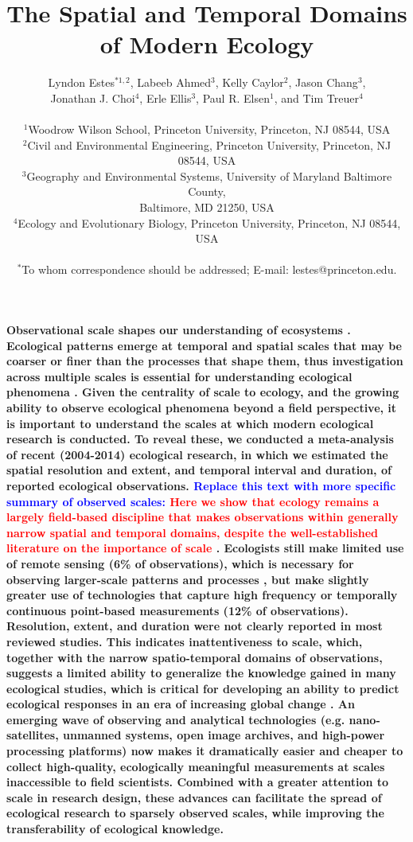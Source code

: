 \documentclass[12pt]{article}
\title{The Spatial and Temporal Domains of Modern Ecology }%
\author
{Lyndon Estes$^{\ast1, 2}$, Labeeb Ahmed$^{3}$, Kelly Caylor$^{2}$, Jason Chang$^{3}$, \\
Jonathan J. Choi$^{4}$, Erle Ellis$^{3}$, Paul R. Elsen$^{1}$, and Tim Treuer$^{4}$ \\
\\
\normalsize{$^{1}$Woodrow Wilson School, Princeton University, Princeton, NJ 08544, USA}\\
\normalsize{$^{2}$Civil and Environmental Engineering, Princeton University, Princeton, NJ 08544, USA}\\
\normalsize{$^{3}$Geography and Environmental Systems, University of Maryland Baltimore County,}\\
\normalsize{Baltimore, MD 21250, USA}\\
\normalsize{$^{4}$Ecology and Evolutionary Biology, Princeton University, Princeton, NJ 08544, USA}\\
\\
\normalsize{$^\ast$To whom correspondence should be addressed; E-mail:  lestes@princeton.edu.}
}
\date{}
\newenvironment{sciabstract}{%
\begin{quote} \bf}
{\end{quote}}
\begin{document}
 


\baselineskip24pt


\maketitle 




\textbf{Observational scale shapes our understanding of ecosystems \cite{levin_problem_1992,chave_problem_2013,wiens_spatial_1989}. Ecological patterns emerge at temporal and spatial scales that may be coarser or finer than the processes that shape them, thus investigation across multiple scales is essential for understanding ecological phenomena \cite{levin_problem_1992}. Given the centrality of scale to ecology, and the growing ability to observe ecological phenomena beyond a field perspective, it is important to understand the scales at which modern ecological research is conducted. To reveal these, we conducted a meta-analysis of recent (2004-2014) ecological research, in which we estimated the spatial resolution and extent, and temporal interval and duration, of reported ecological observations. \textcolor{blue}{Replace this text with more specific summary of observed scales:} \textcolor{red}{Here we show that ecology remains a largely field-based discipline that makes observations within generally narrow spatial and temporal domains, despite the well-established literature on the importance of scale \cite{levin_problem_1992,chave_problem_2013,wiens_spatial_1989}}. Ecologists still make limited use of remote sensing (6\% of observations), which is necessary for observing larger-scale patterns and processes \cite{turner_remote_2003,pettorelli_satellite_2014}, but make slightly greater use of technologies that capture high frequency or temporally continuous point-based measurements (12\% of observations). Resolution, extent, and duration were not clearly reported in most reviewed studies. This indicates inattentiveness to scale, which, together with the narrow spatio-temporal domains of observations, suggests a limited ability to generalize the knowledge gained in many ecological studies, which is critical for developing an ability to predict ecological responses in an era of increasing global change \cite{levin_problem_1992}. An emerging wave of observing and analytical technologies (e.g. nano-satellites, unmanned systems, open image archives, and high-power processing platforms) now makes it dramatically easier and cheaper to collect high-quality, ecologically meaningful measurements at scales inaccessible to field scientists. Combined with a greater attention to scale in research design, these advances can facilitate the spread of ecological research to sparsely observed scales, while improving the transferability of ecological knowledge.}
\end{document}

